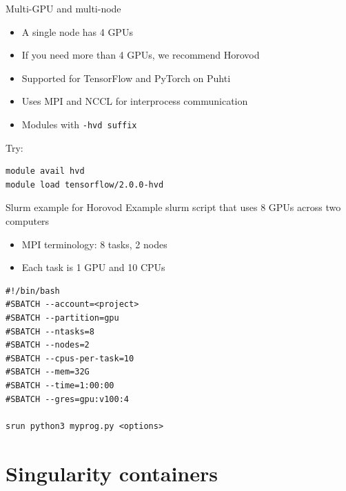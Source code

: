 \documentclass[aspectratio=1610,14pt]{beamer}
\begin{document}
\begin{frame}[fragile]{Multi-GPU and multi-node}
  \begin{itemize}
  \item A single node has 4 GPUs
  \item If you need more than 4 GPUs, we recommend \alert{Horovod}
  \item Supported for TensorFlow and PyTorch on Puhti
  \item Uses MPI and NCCL for interprocess communication
  \item Modules with {\tt -hvd suffix}
  \end{itemize}

  \vspace{0.7em}

  Try: \vspace{-2mm}
\begin{verbatim}
module avail hvd
module load tensorflow/2.0.0-hvd
\end{verbatim}

\end{frame}  

\begin{frame}[fragile]{Slurm example for Horovod}
  Example slurm script that uses \alert{8 GPUs} across \alert{two computers}

\begin{itemize}
\item MPI terminology: 8 tasks, 2 nodes
\item Each task is 1 GPU and 10 CPUs
\end{itemize}
  
  \begin{verbatim}
#!/bin/bash
#SBATCH --account=<project>
#SBATCH --partition=gpu
#SBATCH --ntasks=8
#SBATCH --nodes=2
#SBATCH --cpus-per-task=10
#SBATCH --mem=32G
#SBATCH --time=1:00:00
#SBATCH --gres=gpu:v100:4

srun python3 myprog.py <options>
\end{verbatim}
\end{frame}


\section{Singularity containers}
\end{document}
